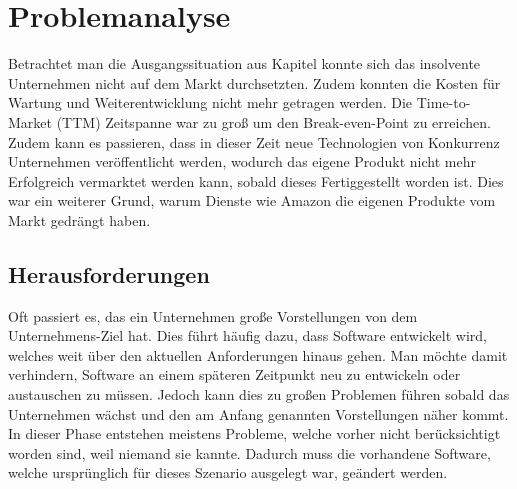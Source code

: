 \chapter{Problemanalyse}
\label{chap:analyse}
Betrachtet man die Ausgangssituation aus Kapitel  konnte sich das insolvente Unternehmen nicht auf dem Markt durchsetzten. Zudem konnten die Kosten für Wartung und Weiterentwicklung nicht mehr getragen werden. Die Time-to-Market (TTM) Zeitspanne war zu groß um den Break-even-Point zu erreichen. Zudem kann es passieren, dass in dieser Zeit neue Technologien von Konkurrenz Unternehmen veröffentlicht werden, wodurch das eigene Produkt nicht mehr Erfolgreich vermarktet werden kann, sobald dieses Fertiggestellt worden ist. Dies war ein weiterer Grund, warum Dienste wie Amazon die eigenen Produkte vom Markt gedrängt haben.

\section{Herausforderungen}
\label{sec:herausforderung}
Oft passiert es, das ein Unternehmen große Vorstellungen von dem Unternehmens-Ziel hat. Dies führt häufig dazu, dass Software entwickelt wird, welches weit über den aktuellen Anforderungen hinaus gehen. Man möchte damit verhindern, Software an einem späteren Zeitpunkt neu zu entwickeln oder austauschen zu müssen. Jedoch kann dies zu großen Problemen führen sobald das Unternehmen wächst und den am Anfang genannten Vorstellungen näher kommt. In dieser Phase entstehen meistens Probleme, welche vorher nicht berücksichtigt worden sind, weil niemand sie kannte. Dadurch muss die vorhandene Software, welche ursprünglich für dieses Szenario ausgelegt war, geändert werden.

